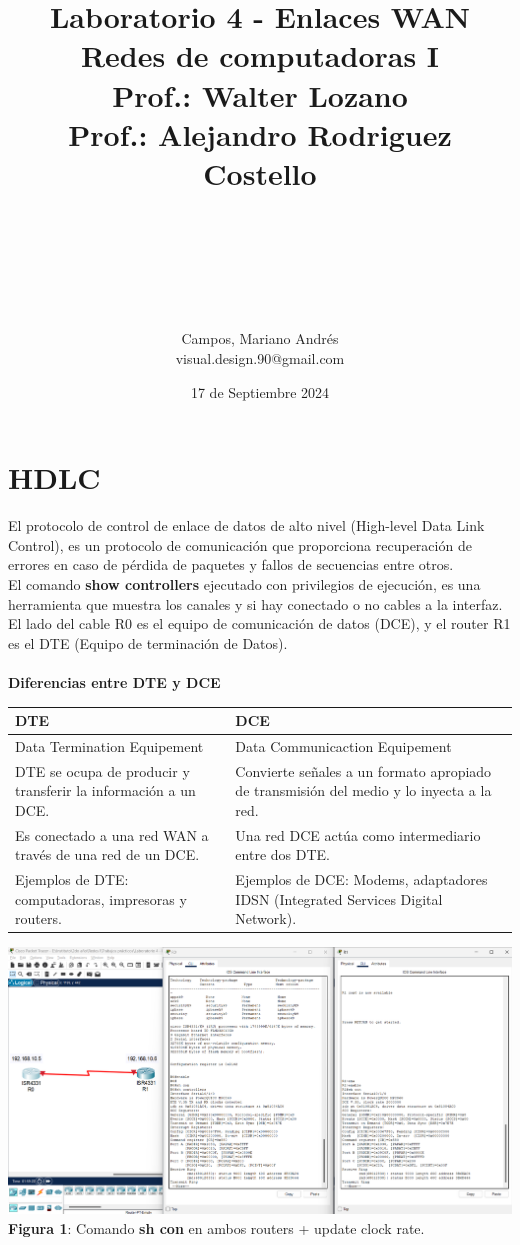 \documentclass{article}
\title{\bfseries \huge Laboratorio 4 - Enlaces WAN \normalsize{\linebreak\\Redes de computadoras I \\Prof.: Walter Lozano\\Prof.: Alejandro Rodriguez Costello}}
\author{\\\\\\\\\\\\Campos, Mariano Andrés \\ {\small visual.design.90@gmail.com}}
\date{\small 17 de Septiembre 2024}
\begin{document}
    \maketitle
    \newpage

    \section{HDLC}
    El protocolo de control de enlace de datos de alto nivel (High-level Data Link Control), es un protocolo de comunicación que proporciona recuperación de errores en caso de pérdida de paquetes y fallos de secuencias entre otros.\\
    El comando {\bfseries show controllers} ejecutado con privilegios de ejecución, es una herramienta que muestra los canales y si hay conectado o no cables a la interfaz.\\
    El lado del cable R0 es el equipo de comunicación de datos (DCE), y el router R1 es el DTE (Equipo de terminación de Datos).\\ \\
    {\bfseries Diferencias entre DTE y DCE}
    \begin{center}
        \begin{tabular}{| p{9cm} | p{9cm} |}\hline
            {\bfseries DTE} & {\bfseries DCE} \\\hline
            Data Termination Equipement & Data Communicaction Equipement \\\hline
            DTE se ocupa de producir y transferir la información a un DCE. & Convierte señales a un formato apropiado de transmisión del medio y lo inyecta a la red. \\\hline
            Es conectado a una red WAN a través de una red de un DCE. & Una red DCE actúa como intermediario entre dos DTE. \\\hline 
            Ejemplos de DTE: computadoras, impresoras y routers. & Ejemplos de DCE: Modems, adaptadores IDSN (Integrated Services Digital Network).\\\hline
        \end{tabular}
    \end{center}

    \begin{center}
        \includegraphics[width=0.875\linewidth]{img_01} 
        \linebreak
        \small {\bfseries Figura 1}: Comando {\bfseries sh con} en ambos routers + update clock rate.
    \end{center}
\end{document}
